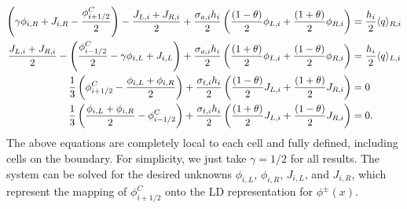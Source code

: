 \begin{align}\label{eq:update1}
    \left(\gamma\phi_{i,R} + J_{i,R} - \frac{\phi_{{i+1/2}}^C}{2} \right) - \frac{J_{L,i} + J_{R,i}}{2} + \frac{\sigma_{a,i} h_i}{2} \left(
    \frac{(1-\theta)}{2} \phi_{L,i} +
    \frac{(1+\theta)}{2}\phi_{R,i}\right) &= \frac{h_i}{2} \langle q \rangle_{R,i} \\
    \frac{J_{L,i} + J_{R,i}}{2} -\left(\frac{\phi_{i-1/2}^C}{2} - \gamma \phi_{i,L} +
    J_{i,L}\right) + \frac{\sigma_{a,i} h_i}{2} \left(
    \frac{(1+\theta)}{2} \phi_{L,i} +
    \frac{(1-\theta)}{2}\phi_{R,i}\right) &= \frac{h_i}{2} \langle q \rangle_{L,i} 
    \\
    \frac{1}{3}\left(\phi_{i+1/2}^C - \frac{\phi_{i,L} + \phi_{i,R}}{2}\right) +
    \frac{\sigma_{t,i} h_i}{2}\left( \frac{(1-\theta)}{2} J_{L,i} +
    \frac{(1+\theta)}{2}J_{R,i}\right)    &= 0 \\
    \frac{1}{3}\left(\frac{\phi_{i,L} + \phi_{i,R}}{2} - \phi^C_{i-1/2} \right) +
    \frac{\sigma_{t,i} h_i}{2} \left( \frac{(1+\theta)}{2} J_{L,i} +
    \frac{(1-\theta)}{2}J_{R,i}\right) &= 0 . \label{eq:update2}
\end{align}
The above equations are completely local to each cell and fully defined, including cells
on the boundary. For simplicity, we just take $\gamma=1/2$ for all results.  The system can be solved for the desired unknowns
$\phi_{i,L}$, $\phi_{i,R}$, $J_{i,L}$, and $J_{i,R}$, which represent the mapping of
$\phi_{i+1/2}^C$ onto the LD representation for $\phi^{\pm}(x)$.


